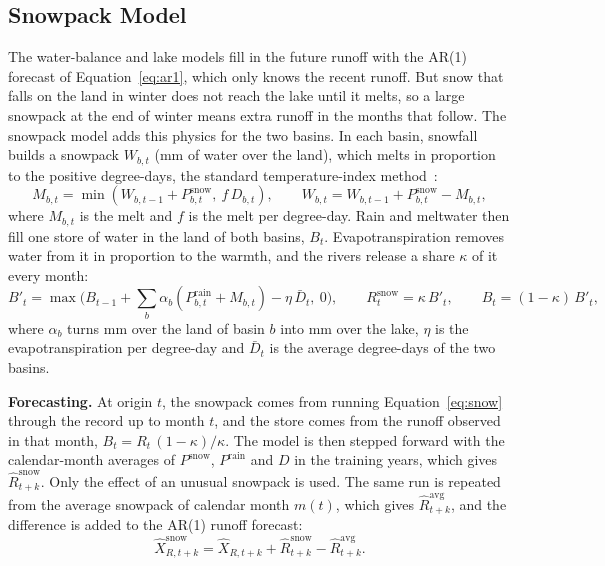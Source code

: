 \documentclass{article}
\begin{document}
\subsection{Snowpack Model}
\label{sec:snow}

The water-balance and lake models fill in the future runoff with the AR(1) forecast of
Equation~\ref{eq:ar1}, which only knows the recent runoff. But snow that falls on the land in
winter does not reach the lake until it melts, so a large snowpack at the end of winter means
extra runoff in the months that follow. The snowpack model adds this physics for the two basins.
In each basin, snowfall builds a snowpack $W_{b,t}$ (mm of water over the land), which melts in
proportion to the positive degree-days, the standard temperature-index method~\cite{hock2003}:
\begin{equation}
M_{b,t} = \min\left(W_{b,t-1} + P^{\mathrm{snow}}_{b,t},\ f\,D_{b,t}\right), \qquad
W_{b,t} = W_{b,t-1} + P^{\mathrm{snow}}_{b,t} - M_{b,t}, \label{eq:snow}
\end{equation}
where $M_{b,t}$ is the melt and $f$ is the melt per degree-day. Rain and meltwater then fill one
store of water in the land of both basins, $B_t$. Evapotranspiration removes water from it in
proportion to the warmth, and the rivers release a share $\kappa$ of it every month:
\begin{equation}
B'_t = \max\Big(B_{t-1} + \sum_{b} \alpha_b \left(P^{\mathrm{rain}}_{b,t} + M_{b,t}\right)
- \eta\,\bar D_t,\ 0\Big), \qquad R^{\mathrm{snow}}_t = \kappa\,B'_t, \qquad
B_t = (1 - \kappa)\,B'_t, \label{eq:store}
\end{equation}
where $\alpha_b$ turns mm over the land of basin $b$ into mm over the lake, $\eta$ is the
evapotranspiration per degree-day and $\bar D_t$ is the average degree-days of the two basins.

\textbf{Forecasting.} At origin $t$, the snowpack comes from running Equation~\ref{eq:snow}
through the record up to month $t$, and the store comes from the runoff observed in that month,
$B_t = R_t\,(1 - \kappa)/\kappa$. The model is then stepped forward with the calendar-month
averages of $P^{\mathrm{snow}}$, $P^{\mathrm{rain}}$ and $D$ in the training years, which gives
$\hat R^{\mathrm{snow}}_{t+k}$. Only the effect of an unusual snowpack is used. The same run is
repeated from the average snowpack of calendar month $m(t)$, which gives
$\hat R^{\mathrm{avg}}_{t+k}$, and the difference is added to the AR(1) runoff forecast:
\begin{equation}
\hat X^{\mathrm{snow}}_{R,t+k} = \hat X_{R,t+k} + \hat R^{\mathrm{snow}}_{t+k}
- \hat R^{\mathrm{avg}}_{t+k}. \label{eq:snowforecast}
\end{equation}
\end{document}
